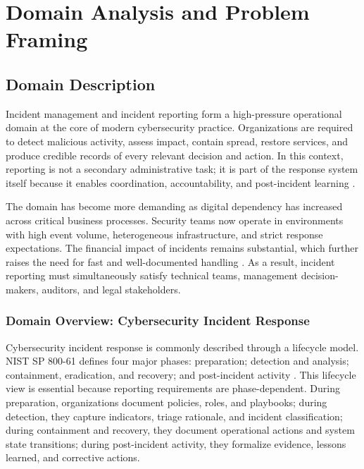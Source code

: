 \chapter*{Domain Analysis and Problem Framing}
{}

\section{Domain Description}

Incident management and incident reporting form a high-pressure operational domain at the core of modern cybersecurity practice. Organizations are required to detect malicious activity, assess impact, contain spread, restore services, and produce credible records of every relevant decision and action. In this context, reporting is not a secondary administrative task; it is part of the response system itself because it enables coordination, accountability, and post-incident learning \cite{nist_800_61,iso_27035}.

The domain has become more demanding as digital dependency has increased across critical business processes. Security teams now operate in environments with high event volume, heterogeneous infrastructure, and strict response expectations. The financial impact of incidents remains substantial, which further raises the need for fast and well-documented handling \cite{ibm_breach_2023}. As a result, incident reporting must simultaneously satisfy technical teams, management decision-makers, auditors, and legal stakeholders.

\subsection{Domain Overview: Cybersecurity Incident Response}

Cybersecurity incident response is commonly described through a lifecycle model. NIST SP 800-61 defines four major phases: preparation; detection and analysis; containment, eradication, and recovery; and post-incident activity \cite{nist_800_61}. This lifecycle view is essential because reporting requirements are phase-dependent. During preparation, organizations document policies, roles, and playbooks; during detection, they capture indicators, triage rationale, and incident classification; during containment and recovery, they document operational actions and system state transitions; during post-incident activity, they formalize evidence, lessons learned, and corrective actions.

